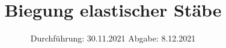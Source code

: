 

\subject{V103}
\title{Biegung elastischer Stäbe}
\date{%
  Durchführung: 30.11.2021
  \hspace{3em}
  Abgabe: 8.12.2021
}



\maketitle
\thispagestyle{empty}
\tableofcontents
\newpage






\printbibliography{}



